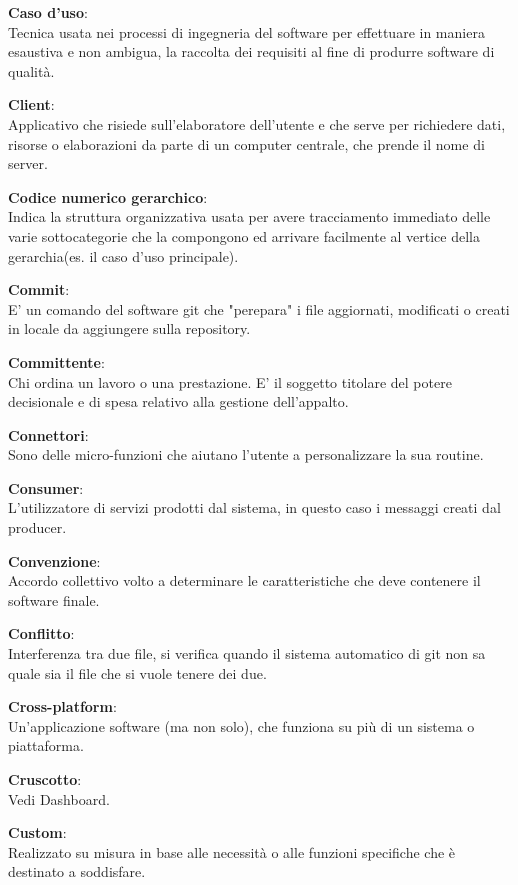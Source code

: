 \documentclass[a4paper, oneside, openany, dvipsnames, table]{article}
\begin{document}
\textbf{Caso d'uso}:\\	Tecnica usata nei processi di ingegneria del software per effettuare in maniera esaustiva e non ambigua, la raccolta dei requisiti al fine di produrre software di qualità.

\textbf{Client}:\\	Applicativo che risiede sull'elaboratore dell'utente e che serve per richiedere dati, risorse o elaborazioni da parte di un computer centrale, che prende il nome di server.

\textbf{Codice numerico gerarchico}:\\  Indica la struttura organizzativa usata per avere tracciamento immediato delle varie sottocategorie che la compongono ed  arrivare  facilmente al vertice della gerarchia(es. il caso d'uso principale).

\textbf{Commit}:\\	E' un comando del software git che "perepara" i file aggiornati, modificati o creati in locale da aggiungere sulla repository.

\textbf{Committente}:\\	Chi ordina un lavoro o una prestazione. E' il soggetto titolare del potere decisionale e di spesa relativo alla gestione dell'appalto.

\textbf{Connettori}:\\	Sono delle micro-funzioni che aiutano l'utente a personalizzare la sua routine.

\textbf{Consumer}:\\	L'utilizzatore di servizi prodotti dal sistema, in questo caso i messaggi creati dal producer.

\textbf{Convenzione}:\\	Accordo collettivo volto a determinare le caratteristiche che deve contenere il software finale.

\textbf{Conflitto}:\\	Interferenza tra due file, si verifica quando il sistema automatico di git non sa quale sia il file che si vuole tenere dei due.

\textbf{Cross-platform}:\\	Un'applicazione software (ma non solo), che funziona su più di un sistema o piattaforma.

\textbf{Cruscotto}:\\	Vedi Dashboard.

\textbf{Custom}:\\	Realizzato su misura in base alle necessità  o alle funzioni specifiche che è destinato a soddisfare.	
\end{document}
